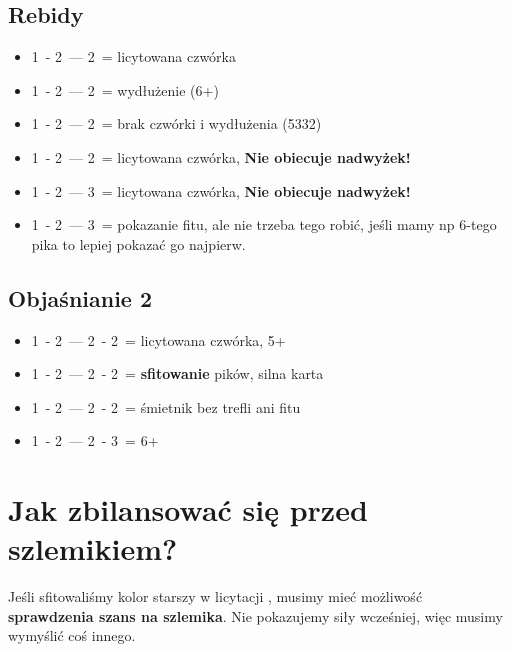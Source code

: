 \documentclass[12pt, a4paper]{article}
\begin{document}
    \subsection{Rebidy}
    \begin{itemize}
        \item 1\spades\ - 2\clubs\ --- 2\diams\ = licytowana czwórka
        \item 1\spades\ - 2\clubs\ --- 2\spades\ = wydłużenie (6+\spades)
        \item 1\spades\ - 2\clubs\ --- 2\nt\ = brak czwórki i wydłużenia (5332)
        \item 1\hearts\ - 2\clubs\ --- 2\spades\ = licytowana czwórka, \textbf{Nie obiecuje nadwyżek!}
        \item 1\hearts\ - 2\diams\ --- 3\clubs\ = licytowana czwórka, \textbf{Nie obiecuje nadwyżek!}
        \item 1\spades\ - 2\diams\ --- 3\diams\ = pokazanie fitu, ale nie trzeba tego robić, 
        jeśli mamy np 6-tego pika to lepiej pokazać go najpierw.
    \end{itemize}

    \subsection{Objaśnianie 2\clubs}
    \begin{itemize}
        \item 1\spades\ - 2\clubs\ --- 2\diams\ - 2\hearts\ = licytowana czwórka, 5+\clubs
        \item 1\spades\ - 2\clubs\ --- 2\diams\ - 2\spades\ = \textbf{sfitowanie} pików, silna karta
        \item 1\spades\ - 2\clubs\ --- 2\diams\ - 2\nt\ = śmietnik bez trefli ani fitu
        \item 1\spades\ - 2\clubs\ --- 2\diams\ - 3\clubs\ = 6+\clubs
    \end{itemize}

    \pagebreak
    \section{Jak zbilansować się przed szlemikiem?}
    Jeśli sfitowaliśmy kolor starszy w licytacji \gf, musimy mieć możliwość \textbf{sprawdzenia szans na szlemika}.
    Nie pokazujemy siły wcześniej, więc musimy wymyślić coś innego.
\end{document}
